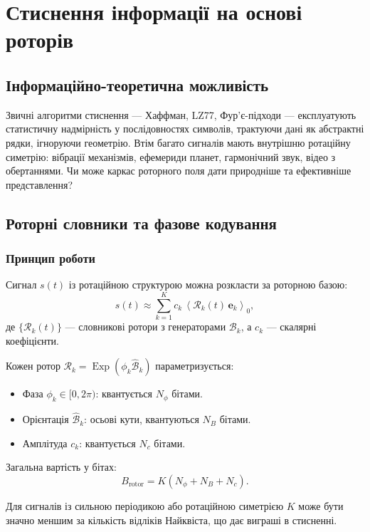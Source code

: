 \documentclass[11pt,a4paper]{article}
\newcommand{\grade}[2]{\left\langle #1 \right\rangle_{#2}}
\newcommand{\scal}[1]{\grade{#1}{0}}
\newcommand{\Exp}{\operatorname{Exp}}
\newcommand{\Rotor}{\mathcal{R}}
\newcommand{\Biv}{\mathcal{B}}
\theoremstyle{definition}
\theoremstyle{plain}
\theoremstyle{remark}
\begin{document}
\section{Стиснення інформації на основі роторів}\label{sec:compression}

\subsection{Інформаційно-теоретична можливість}

Звичні алгоритми стиснення — Хаффман, LZ77, Фур’є-підходи — експлуатують статистичну надмірність у послідовностях символів, трактуючи дані як абстрактні рядки, ігноруючи геометрію. Втім багато сигналів мають внутрішню ротаційну симетрію: вібрації механізмів, ефемериди планет, гармонічний звук, відео з обертаннями. Чи може каркас роторного поля дати природніше та ефективніше представлення?

\subsection{Роторні словники та фазове кодування}

\subsubsection{Принцип роботи}

Сигнал $s(t)$ із ротаційною структурою можна розкласти за роторною базою:
\begin{equation}
s(t) \approx \sum_{k=1}^K c_k \,\scal{\Rotor_k(t)\, \mathbf{e}_k},
\end{equation}
де $\{\Rotor_k(t)\}$ — словникові ротори з генераторами $\Biv_k$, а $c_k$ — скалярні коефіцієнти.

Кожен ротор $\Rotor_k = \Exp(\phi_k \hat{\Biv}_k)$ параметризується:
\begin{itemize}
  \item Фаза $\phi_k \in [0, 2\pi)$: квантується $N_\phi$ бітами.
  \item Орієнтація $\hat{\Biv}_k$: осьові кути, квантуються $N_B$ бітами.
  \item Амплітуда $c_k$: квантується $N_c$ бітами.
\end{itemize}

Загальна вартість у бітах:
\begin{equation}
B_{\text{rotor}} = K(N_\phi + N_B + N_c).
\end{equation}

Для сигналів із сильною періодикою або ротаційною симетрією $K$ може бути значно меншим за кількість відліків Найквіста, що дає виграші в стисненні.
\end{document}
